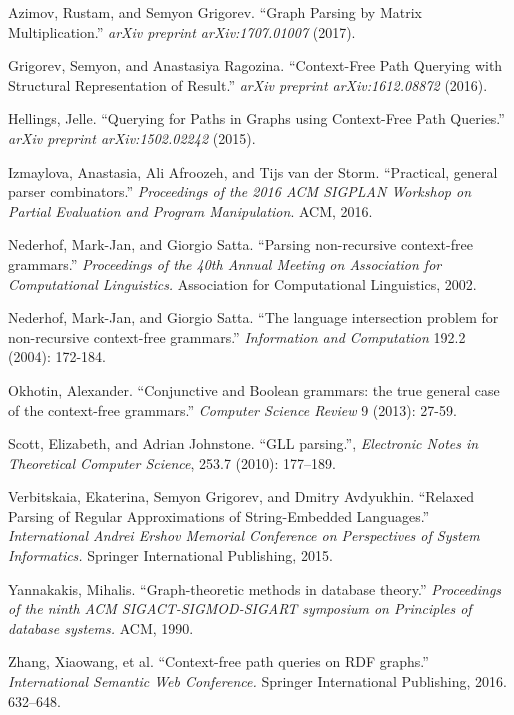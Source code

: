 \documentclass{vldb}
\begin{document}
\begin{thebibliography}{9}

   Azimov, Rustam, and Semyon Grigorev.
   ``Graph Parsing by Matrix Multiplication.''
   \emph{arXiv preprint arXiv:1707.01007}
   (2017).


  Grigorev, Semyon, and Anastasiya Ragozina. 
  ``Context-Free Path Querying with Structural Representation of Result.''
   \emph{arXiv preprint arXiv:1612.08872}
    (2016).

  Hellings, Jelle.
  ``Querying for Paths in Graphs using Context-Free Path Queries.''
  \emph{arXiv preprint arXiv:1502.02242} (2015).

  Izmaylova, Anastasia, Ali Afroozeh, and Tijs van der Storm.
  ``Practical, general parser combinators.''
  \emph{Proceedings of the 2016 ACM SIGPLAN Workshop on Partial Evaluation and Program Manipulation}. ACM, 2016.   

  Nederhof, Mark-Jan, and Giorgio Satta.
  ``Parsing non-recursive context-free grammars.''
  \emph{Proceedings of the 40th Annual Meeting on Association for Computational Linguistics.}
  Association for Computational Linguistics, 2002.

  Nederhof, Mark-Jan, and Giorgio Satta.
  ``The language intersection problem for non-recursive context-free grammars.''
  \emph{Information and Computation} 192.2 (2004): 172-184.

  Okhotin, Alexander.
  ``Conjunctive and Boolean grammars: the true general case of the context-free grammars.''
  \emph{Computer Science Review} 9 (2013): 27-59.

  Scott, Elizabeth, and Adrian Johnstone.   
  ``GLL parsing.'',
  \emph{Electronic Notes in Theoretical Computer Science},
  253.7 (2010): 177--189.

  Verbitskaia, Ekaterina, Semyon Grigorev, and Dmitry Avdyukhin.
  ``Relaxed Parsing of Regular Approximations of String-Embedded Languages.''
  \emph{International Andrei Ershov Memorial Conference on Perspectives of System Informatics.}
  Springer International Publishing, 2015.

  Yannakakis, Mihalis.
  ``Graph-theoretic methods in database theory.''
  \emph{Proceedings of the ninth ACM SIGACT-SIGMOD-SIGART symposium on Principles of database systems.}
   ACM, 1990.

  Zhang, Xiaowang, et al.
  ``Context-free path queries on RDF graphs.'' 
  \emph{International Semantic Web Conference.}
   Springer International Publishing, 2016.
   632--648.
   
\end{thebibliography}
\end{document}

